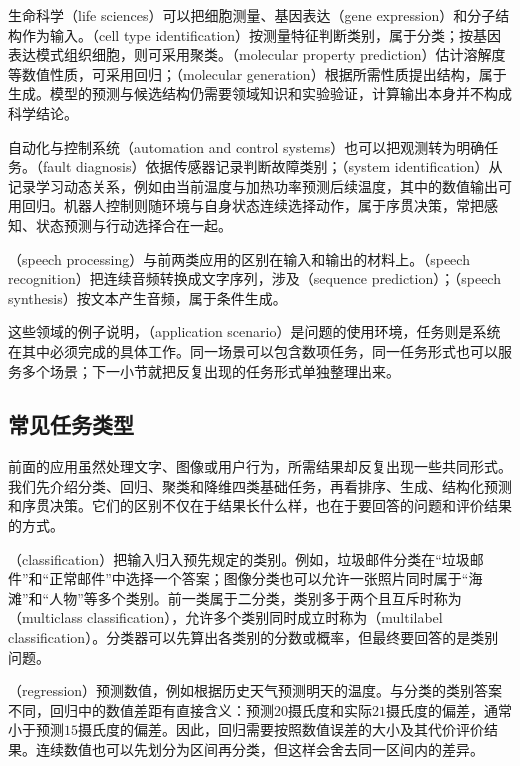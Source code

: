 生命科学（life sciences）可以把细胞测量、基因表达（gene expression）和分子结构作为输入。（cell type identification）按测量特征判断类别，属于分类；按基因表达模式组织细胞，则可采用聚类。（molecular property prediction）估计溶解度等数值性质，可采用回归；（molecular generation）根据所需性质提出结构，属于生成。模型的预测与候选结构仍需要领域知识和实验验证，计算输出本身并不构成科学结论。

自动化与控制系统（automation and control systems）也可以把观测转为明确任务。（fault diagnosis）依据传感器记录判断故障类别；（system identification）从记录学习动态关系，例如由当前温度与加热功率预测后续温度，其中的数值输出可用回归。机器人控制则随环境与自身状态连续选择动作，属于序贯决策，常把感知、状态预测与行动选择合在一起。

（speech processing）与前两类应用的区别在输入和输出的材料上。（speech recognition）把连续音频转换成文字序列，涉及（sequence prediction）；（speech synthesis）按文本产生音频，属于条件生成。

这些领域的例子说明，（application scenario）是问题的使用环境，任务则是系统在其中必须完成的具体工作。同一场景可以包含数项任务，同一任务形式也可以服务多个场景；下一小节就把反复出现的任务形式单独整理出来。

\subsection{常见任务类型}

前面的应用虽然处理文字、图像或用户行为，所需结果却反复出现一些共同形式。我们先介绍分类、回归、聚类和降维四类基础任务，再看排序、生成、结构化预测和序贯决策。它们的区别不仅在于结果长什么样，也在于要回答的问题和评价结果的方式。

（classification）把输入归入预先规定的类别。例如，垃圾邮件分类在“垃圾邮件”和“正常邮件”中选择一个答案；图像分类也可以允许一张照片同时属于“海滩”和“人物”等多个类别。前一类属于二分类，类别多于两个且互斥时称为（multiclass classification），允许多个类别同时成立时称为（multilabel classification）。分类器可以先算出各类别的分数或概率，但最终要回答的是类别问题。

（regression）预测数值，例如根据历史天气预测明天的温度。与分类的类别答案不同，回归中的数值差距有直接含义：预测$20$摄氏度和实际$21$摄氏度的偏差，通常小于预测$15$摄氏度的偏差。因此，回归需要按照数值误差的大小及其代价评价结果。连续数值也可以先划分为区间再分类，但这样会舍去同一区间内的差异。

